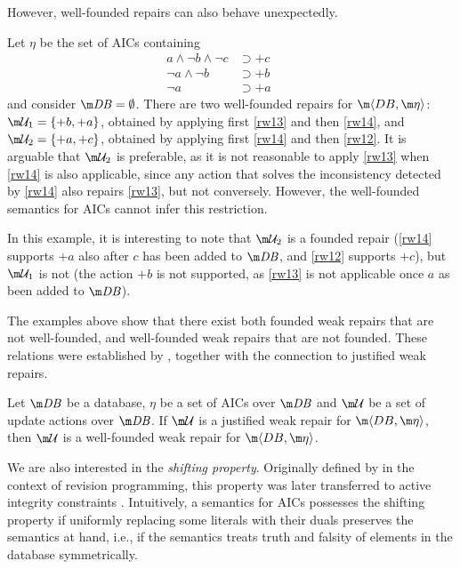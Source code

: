 However, well-founded repairs can also behave unexpectedly.
\begin{example}
  \label{ex:well-founded}
  Let $\eta$ be the set of AICs containing
  \begin{align}
  a\land\neg b\land\neg c &\supset{+c} \label{rw12} \\
  \neg a\land\neg b &\supset{+b} \label{rw13} \\%
  \neg a &\supset{+a} \qquad \label{rw14}
  \end{align}
  and consider $\db=\emptyset$.
  There are two well-founded repairs for $\fulldb$: $\UU_1=\{{+b},{+a}\}$, obtained by applying first \ref{rw13} and then \ref{rw14}, and $\UU_2=\{{+a},{+c}\}$, obtained by applying first \ref{rw14} and then \ref{rw12}.
  It is arguable that $\UU_2$ is preferable, as it is not reasonable to apply \ref{rw13} when \ref{rw14} is also applicable, since any action that solves the inconsistency detected by \ref{rw14} also repairs \ref{rw13}, but not conversely.
  However, the well-founded semantics for AICs cannot infer this restriction.
\end{example}
In this example, it is interesting to note that $\UU_2$ is a founded repair (\ref{rw14} supports ${+a}$ also after $c$ has been added to $\db$, and \ref{rw12} supports ${+c}$), but $\UU_1$ is not (the action ${+b}$ is not supported, as \ref{rw13} is not applicable once $a$ as been added to $\db$).

The examples above show that there exist both founded weak repairs that are not well-founded, and well-founded weak repairs that are not founded.
These relations were established by \citet{tase/Cruz-FilipeEGN13}, together with the connection to justified weak repairs.
\begin{lemma}
  \label{lem:justified-wf}
  Let $\db$ be a database, $\eta$ be a set of AICs over $\db$ and $\UU$ be a set of update actions over $\db$.
  If $\UU$ is a justified weak repair for $\fulldb$, then $\UU$ is a well-founded weak repair for $\fulldb$.
\end{lemma}

We are also interested in the \emph{shifting property}.
Originally defined by \citet{tcs/MarekT98} in the context of revision programming, this property was later transferred to active integrity constraints \cite{tplp/CaropreseT11}. 
Intuitively, a semantics for AICs possesses the shifting property if uniformly replacing some literals with their duals
preserves the semantics at hand, i.e., if the semantics treats truth and falsity of elements in the database symmetrically.

